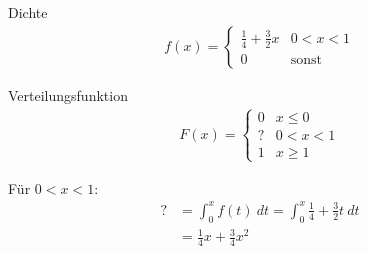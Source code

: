 \documentclass[t,11pt]{beamer}
\begin{document}
\begin{frame}
\begin{block}{Dichte}
	\vspace{-0.5cm}
	\begin{align*}
	f(x)=\begin{cases}
	\frac{1}{4}+\frac{3}{2} x & 0<x<1\\
	0 & \text{sonst}
	\end{cases}
	\end{align*}
\end{block}

\begin{block}{Verteilungsfunktion}
	\vspace{-0.5cm}
	\begin{align*}
	F(x)=\begin{cases}
	0 & x\leq 0 \\
	?  & 0<x<1\\
	1 & x \geq 1
	\end{cases}
	\end{align*}
\end{block}

Für $0<x<1$:
\begin{align*}
	? &= \int_{0}^{x} f(t)~dt =  \int_{0}^{x} \frac{1}{4}+\frac{3}{2} t ~dt \\
	&= \frac{1}{4}x +\frac{3}{4}x^2
\end{align*}
\end{frame}
\end{document}
